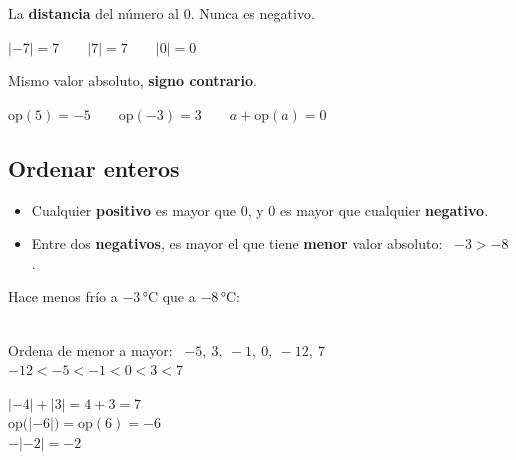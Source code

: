 \documentclass[11pt,a4paper]{article}
\begin{document}
\vfill
\begin{tcbraster}[raster columns=2,raster equal height,raster column skip=10pt]
\begin{tcolorbox}[fmbase,colback=fmdefbg,colframe=fmdef,coltitle=white,title={Valor absoluto \ $|a|$}]
La \textbf{distancia} del número al 0. Nunca es negativo.\par\smallskip
{\centering$|-7|=7\qquad |7|=7\qquad |0|=0$\par}
\end{tcolorbox}
\begin{tcolorbox}[fmbase,colback=fmdefbg,colframe=fmdef,coltitle=white,title={Opuesto \ $\text{op}(a)=-a$}]
Mismo valor absoluto, \textbf{signo contrario}.\par\smallskip
{\centering$\text{op}(5)=-5\qquad \text{op}(-3)=3\qquad a+\text{op}(a)=0$\par}
\end{tcolorbox}
\end{tcbraster}

\vfill
\subsection{Ordenar enteros}
\begin{minipage}[t]{0.52\linewidth}
\begin{idea}
\begin{itemize}[leftmargin=1em]
\item Cualquier \textbf{positivo} es mayor que 0, y 0 es mayor que cualquier \textbf{negativo}.
\item Entre dos \textbf{negativos}, es mayor el que tiene \textbf{menor} valor absoluto: \ $-3>-8$.
\end{itemize}
\end{idea}
\end{minipage}\hfill
\begin{minipage}[t]{0.45\linewidth}
\begin{truc}
Hace menos frío a $-3$\,°C que a $-8$\,°C:\\[3pt]
\hspace*{1em}{\Large$-3>-8$} \ \ {\color{fmA}\Large\faThermometerQuarter}
\end{truc}
\end{minipage}

\vfill
\begin{exemple}[Ejemplos]
\begin{minipage}[t]{0.5\linewidth}
Ordena de menor a mayor: \ $-5,\ 3,\ -1,\ 0,\ -12,\ 7$\\[4pt]
{\large$-12<-5<-1<0<3<7$}
\end{minipage}\hfill
\begin{minipage}[t]{0.47\linewidth}
$|-4|+|3|=4+3=7$\\[3pt]
$\text{op}\big(|-6|\big)=\text{op}(6)=-6$\\[3pt]
$-|-2|=-2$
\end{minipage}
\end{exemple}
\end{document}
